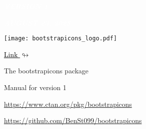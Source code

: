 \documentclass{article}
\begin{document}
\thispagestyle{empty}


\begin{flushright}
\begin{tcolorbox}[leftrule=3mm,arc=0mm,width=4.5cm]
\begin{center}
{\Large\textcolor{white}{\it\bf VERSION 1}}
\end{center}
\end{tcolorbox}
\end{flushright}

\begin{flushright}
\begin{tcolorbox}[leftrule=3mm,arc=0mm,width=6.5cm]
\begin{center}
{\Large\textcolor{white}{\it\bf AUGUST 23, 2025}}
\end{center}
\end{tcolorbox}
\end{flushright}

\hspace{0pt}
\vfill
\begin{center}
\texttt{[image: bootstrapicons\_logo.pdf]}
\end{center}\vspace{2mm}
\begin{center}
    \href{https://github.com/BenSt099/bootstrapicons}{\textcolor{black}{Link $\looparrowright$}}
\end{center}
\vfill
\hspace{0pt}
\newpage

\thispagestyle{empty}

\doublespacing
\tableofcontents
\singlespacing

\newpage
\thispagestyle{empty}
\begin{center}
    \begin{tcolorbox}[colback=white,colframe=gray-700, width=7cm,halign=center,boxrule=0.2mm]
        {\Large The {\sffamily bootstrapicons} package}

        Manual for version 1
    \end{tcolorbox}\vspace{15mm}

    \href{https://www.ctan.org/pkg/bootstrapicons}{\textcolor{blue-700}{https://www.ctan.org/pkg/bootstrapicons}}\vspace{6mm}

    \href{https://github.com/BenSt099/bootstrapicons}{\textcolor{blue-700}{https://github.com/BenSt099/bootstrapicons}}
\end{center}\vspace{7mm}
\end{document}
